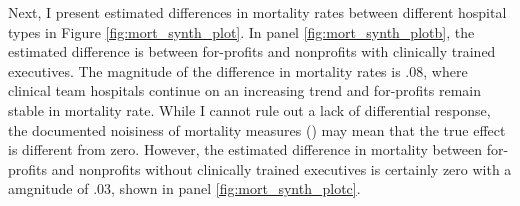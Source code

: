 \documentclass[12pt]{article}
\begin{document}
    Next, I present estimated differences in mortality rates between different hospital types in Figure \ref{fig:mort_synth_plot}. In panel \ref{fig:mort_synth_plotb}, the estimated difference is between for-profits and nonprofits with clinically trained executives. The magnitude of the difference in mortality rates is .08, where clinical team hospitals continue on an increasing trend and for-profits remain stable in mortality rate. While I cannot rule out a lack of differential response, the documented noisiness of mortality measures (\cite{mackenzie2016measuring}) may mean that the true effect is different from zero. However, the estimated difference in mortality between for-profits and nonprofits without clinically trained executives is certainly zero with a amgnitude of .03, shown in panel \ref{fig:mort_synth_plotc}.  
\end{document}
